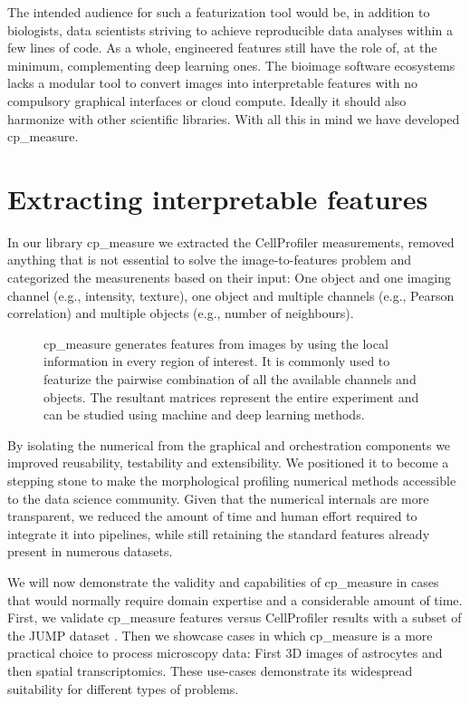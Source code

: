 \documentclass{article}
\begin{document}
The intended audience for such a featurization tool would be, in addition to biologists, data scientists striving to achieve reproducible data analyses within a few lines of code. As a whole, engineered features still have the role of, at the minimum, complementing deep learning ones. The bioimage software ecosystems lacks a modular tool to convert images into interpretable features with no compulsory graphical interfaces or cloud compute. Ideally it should also harmonize with other scientific libraries. With all this in mind we have developed cp\_measure.
\section{Extracting interpretable features}
\label{sec:org61842b5}
In our library cp\_measure we extracted the CellProfiler measurements, removed anything that is not essential to solve the image-to-features problem and categorized the measurenents based on their input: One object and one imaging channel (e.g., intensity, texture), one object and multiple channels (e.g., Pearson correlation) and multiple objects (e.g., number of neighbours).

\begin{figure}[htbp]
\centering

\caption{\label{fig:overview}cp\_measure generates features from images by using the local information in every region of interest. It is commonly used to featurize the pairwise combination of all the available channels and objects. The resultant matrices represent the entire experiment and can be studied using machine and deep learning methods.}
\end{figure}

By isolating the numerical from the graphical and orchestration components we improved reusability, testability and extensibility. We positioned it to become a stepping stone to make the morphological profiling numerical methods accessible to the data science community. Given that the numerical internals are more transparent, we reduced the amount of time and human effort required to integrate it into pipelines, while still retaining the standard features already present in numerous datasets.

We will now demonstrate the validity and capabilities of cp\_measure in cases that would normally require domain expertise and a considerable amount of time. First, we validate cp\_measure features versus CellProfiler results with a subset of the JUMP dataset \citep{chandrasekaranJUMPCellPainting2023}. Then we showcase cases in which cp\_measure is a more practical choice to process microscopy data: First 3D images of astrocytes and then spatial transcriptomics. These use-cases demonstrate its widespread suitability for different types of problems. 
\end{document}
